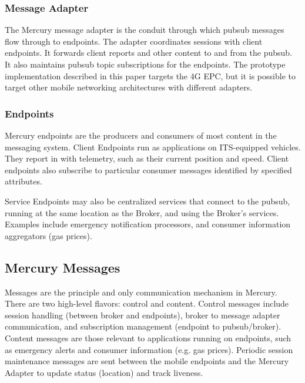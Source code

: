 \subsubsection{Message Adapter}

The Mercury message adapter is the conduit through which pubsub
messages flow through to endpoints. The adapter coordinates sessions
with client endpoints. It forwards client reports and other content to
and from the pubsub. It also maintains pubsub topic subscriptions for
the endpoints. The prototype implementation described in this
paper targets the 4G EPC, but it is possible to target other mobile
networking architectures with different adapters.

\subsubsection{Endpoints}

Mercury endpoints are the producers and consumers of most content in
the messaging system. Client Endpoints run as applications on
ITS-equipped vehicles.  They report in with telemetry, such as their
current position and speed.  Client endpoints also subscribe to
particular consumer messages identified by specified attributes.

Service Endpoints may also be centralized services that connect to the
pubsub, running at the same location as the Broker, and using the
Broker's services. Examples include emergency notification processors,
and consumer information aggregators (gas prices).

\subsection{Mercury Messages}

Messages are the principle and only communication mechanism in
Mercury. There are two high-level flavors: control and
content. Control messages include session handling (between broker and
endpoints), broker to message adapter communication, and subscription
management (endpoint to pubsub/broker).  Content messages are those
relevant to applications running on endpoints, such as emergency
alerts and consumer information (e.g. gas prices).  Periodic session
maintenance messages are sent between the mobile endpoints and the
Mercury Adapter to update status (location) and track liveness.


